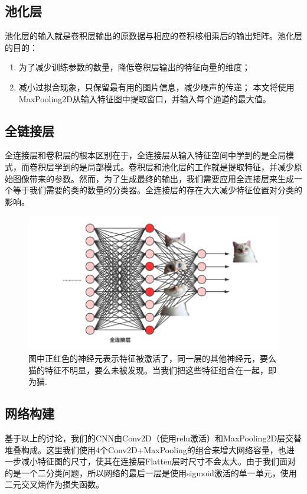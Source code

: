 \documentclass[lang=cn,11pt]{elegantpaper}
\begin{document}
\subsection{池化层}
池化层的输入就是卷积层输出的原数据与相应的卷积核相乘后的输出矩阵。池化层的目的：
\begin{enumerate}
	\item 为了减少训练参数的数量，降低卷积层输出的特征向量的维度；
	\item 减小过拟合现象，只保留最有用的图片信息，减少噪声的传递；
本文将使用MaxPooling2D从输入特征图中提取窗口，并输入每个通道的最大值。
\end{enumerate}

\subsection{全链接层}

全连接层和卷积层的根本区别在于，全连接层从输入特征空间中学到的是全局模式，而卷积层学到的是局部模式。卷积层和池化层的工作就是提取特征，并减少原始图像带来的参数。然而，为了生成最终的输出，我们需要应用全连接层来生成一个等于我们需要的类的数量的分类器。全连接层的存在大大减少特征位置对分类的影响。
\begin{figure}[hbtp]
\centering
  \includegraphics{densecat.png}
  \caption{图中正红色的神经元表示特征被激活了，同一层的其他神经元，要么猫的特征不明显，要么未被发现。当我们把这些特征组合在一起，即为猫. \label{fig:densecat1}}
\end{figure}


\subsection{网络构建}
基于以上的讨论，我们的CNN由Conv2D（使用relu激活）和MaxPooling2D层交替堆叠构成。这里我们使用4个Conv2D+MaxPooling的组合来增大网络容量，也进一步减小特征图的尺寸，使其在连接层Flatten层时尺寸不会太大。由于我们面对的是一个二分类问题，所以网络的最后一层是使用sigmoid激活的单一单元，使用二元交叉熵作为损失函数。
\end{document}
